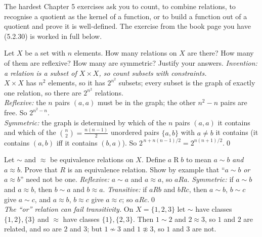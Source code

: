 The hardest Chapter 5 exercises ask you to count, to combine relations, to recognise a quotient as the kernel of a function, or to build a function out of a quotient and prove it is well-defined. The exercise from the book page you have (5.2.30) is worked in full below.

\begin{bexample}
Let $X$ be a set with $n$ elements. How many relations on $X$ are there? How many of them are reflexive? How many are symmetric? Justify your answers.
\solution
\emph{Invention: a relation is a subset of $X\times X$, so count subsets with constraints.}\\
$X\times X$ has $n^2$ elements, so it has $2^{n^2}$ subsets; every subset is the graph of exactly one relation, so there are $2^{n^2}$ relations.\\
\emph{Reflexive:} the $n$ pairs $(a,a)$ must be in the graph; the other $n^2-n$ pairs are free. So $2^{n^2-n}$.\\
\emph{Symmetric:} the graph is determined by which of the $n$ pairs $(a,a)$ it contains and which of the $\binom n2=\frac{n(n-1)}2$ unordered pairs $\{a,b\}$ with $a\ne b$ it contains (it contains $(a,b)$ iff it contains $(b,a)$). So $2^{\,n+n(n-1)/2}=2^{n(n+1)/2}$.\qed
\end{bexample}

\begin{bexample}
Let $\sim$ and $\approx$ be equivalence relations on $X$. Define $a\mathrel Rb$ to mean $a\sim b$ \emph{and} $a\approx b$. Prove that $R$ is an equivalence relation. Show by example that ``$a\sim b$ \emph{or} $a\approx b$'' need not be one.
\solution
\emph{Reflexive:} $a\sim a$ and $a\approx a$, so $aRa$. \emph{Symmetric:} if $a\sim b$ and $a\approx b$, then $b\sim a$ and $b\approx a$. \emph{Transitive:} if $aRb$ and $bRc$, then $a\sim b$, $b\sim c$ give $a\sim c$, and $a\approx b$, $b\approx c$ give $a\approx c$; so $aRc$.\qed\\
\emph{The ``or'' relation can fail transitivity.} On $X=\{1,2,3\}$ let $\sim$ have classes $\{1,2\},\{3\}$ and $\approx$ have classes $\{1\},\{2,3\}$. Then $1\sim2$ and $2\approx3$, so $1$ and $2$ are related, and so are $2$ and $3$; but $1\not\sim3$ and $1\not\approx3$, so $1$ and $3$ are not.
\end{bexample}

